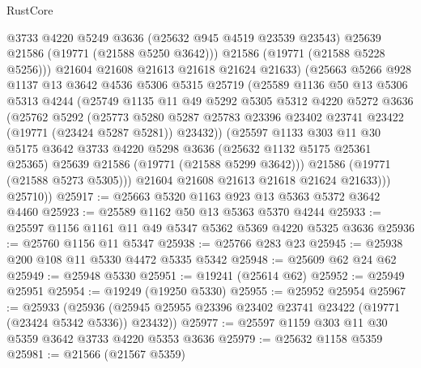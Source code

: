 \begin{lexlean}{RustCore}
\begin{coremodule}
                @3733
                @4220
                @5249
                @3636
                (@25632 @945 @4519 @23539 @23543)
                @25639
                @21586
                (@19771 (@21588 @5250 @3642)))
              @21586
              (@19771 (@21588 @5228 @5256)))
            @21604
            @21608
            @21613
            @21618
            @21624
            @21633)
          (@25663
            @5266
            @928
            @1137
            @13
            @3642
            @4536
            @5306
            @5315
            @25719
            (@25589
              @1136
              @50
              @13
              @5306
              @5313
              @4244
              (@25749
                @1135
                @11
                @49
                @5292
                @5305
                @5312
                @4220
                @5272
                @3636
                (@25762
                  @5292
                  (@25773
                    @5280
                    @5287
                    @25783
                    @23396
                    @23402
                    @23741
                    @23422
                    (@19771 (@23424 @5287 @5281))
                    @23432))
                (@25597
                  @1133
                  @303
                  @11
                  @30
                  @5175
                  @3642
                  @3733
                  @4220
                  @5298
                  @3636
                  (@25632 @1132 @5175 @25361 @25365)
                  @25639
                  @21586
                  (@19771 (@21588 @5299 @3642)))
                @21586
                (@19771 (@21588 @5273 @5305)))
              @21604
              @21608
              @21613
              @21618
              @21624
              @21633)))
        @25710))
@25917 := @25663 @5320 @1163 @923 @13 @5363 @5372 @3642 @4460
@25923 := @25589 @1162 @50 @13 @5363 @5370 @4244
@25933 := @25597 @1156 @1161 @11 @49 @5347 @5362 @5369 @4220 @5325 @3636
@25936 := @25760 @1156 @11 @5347
@25938 := @25766 @283 @23
@25945 := @25938 @200 @108 @11 @5330 @4472 @5335 @5342
@25948 := @25609 @62 @24 @62
@25949 := @25948 @5330
@25951 := @19241 (@25614 @62)
@25952 := @25949 @25951
@25954 := @19249 (@19250 @5330)
@25955 := @25952 @25954
@25967 := @25933
    (@25936 (@25945 @25955 @23396 @23402 @23741 @23422 (@19771 (@23424 @5342 @5336)) @23432))
@25977 := @25597 @1159 @303 @11 @30 @5359 @3642 @3733 @4220 @5353 @3636
@25979 := @25632 @1158 @5359
@25981 := @21566 (@21567 @5359)

\end{coremodule}
\end{lexlean}

